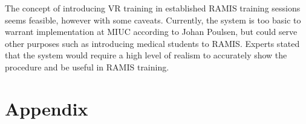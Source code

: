 \documentclass[paper=a4, fontsize=11pt]{scrartcl} %
\numberwithin{equation}{section} %
\numberwithin{figure}{section} %
\numberwithin{table}{section} %
\begin{document}
The concept of introducing VR training in established RAMIS training sessions seems feasible, however with some caveats. Currently, the system is too basic to warrant implementation at MIUC according to Johan Poulsen, but could serve other purposes such as introducing medical students to RAMIS. Experts stated that the system would require a high level of realism to accurately show the procedure and be useful in RAMIS training.




\newpage
\appendix
\chapter{Appendix}


\end{document}
